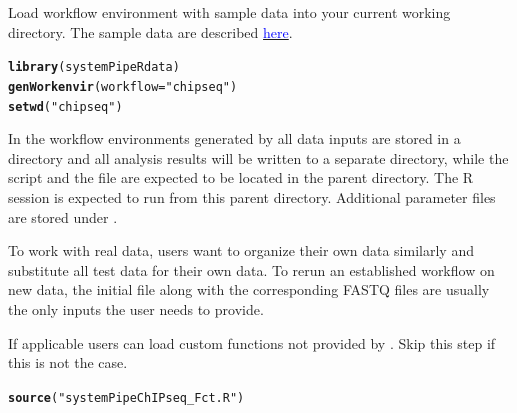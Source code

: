 \documentclass{article}\usepackage[]{graphicx}\usepackage[]{color}
\makeatletter
\newcommand{\hlstr}[1]{\textcolor[rgb]{0.192,0.494,0.8}{#1}}%
\newcommand{\hlstd}[1]{\textcolor[rgb]{0.345,0.345,0.345}{#1}}%
\newcommand{\hlkwc}[1]{\textcolor[rgb]{0.333,0.667,0.333}{#1}}%
\newcommand{\hlkwd}[1]{\textcolor[rgb]{0.737,0.353,0.396}{\textbf{#1}}}%
\newenvironment{kframe}{%
 \def\at@end@of@kframe{}%
 \ifinner\ifhmode%
  \def\at@end@of@kframe{\end{minipage}}%
  \begin{minipage}{\columnwidth}%
 \fi\fi%
 \def\FrameCommand##1{\hskip\@totalleftmargin \hskip-\fboxsep
 \colorbox{shadecolor}{##1}\hskip-\fboxsep
     \hskip-\linewidth \hskip-\@totalleftmargin \hskip\columnwidth}%
 \MakeFramed {\advance\hsize-\width
   \@totalleftmargin\z@ \linewidth\hsize
   \@setminipage}}%
 {\par\unskip\endMakeFramed%
 \at@end@of@kframe}
\newenvironment{knitrout}{}{} %
\makeatother
\begin{document}
Load workflow environment with sample data into your current working directory. The sample data are described  \href{http://www.bioconductor.org/packages/devel/bioc/vignettes/systemPipeR/inst/doc/systemPipeR.html#load-sample-data-and-workflow-templates}{\textcolor{blue}{here}}.
\begin{knitrout}
\color{fgcolor}\begin{kframe}
\begin{alltt}
\hlkwd{library}\hlstd{(systemPipeRdata)}
\hlkwd{genWorkenvir}\hlstd{(}\hlkwc{workflow}\hlstd{=}\hlstr{"chipseq"}\hlstd{)}
\hlkwd{setwd}\hlstd{(}\hlstr{"chipseq"}\hlstd{)}
\end{alltt}
\end{kframe}
\end{knitrout}

In the workflow environments generated by  all data inputs are stored in a  directory and all analysis results will be written to a separate  directory, while the  script and the  file are expected to be located in the parent directory. The R session is expected to run from this parent directory. Additional parameter files are stored under .

To work with real data, users want to organize their own data similarly and substitute all test data for their own data. To rerun an established workflow on new data, the initial  file along with the corresponding FASTQ files are usually the only inputs the user needs to provide.

If applicable users can load custom functions not provided by . Skip this step if this is not the case.
\begin{knitrout}
\color{fgcolor}\begin{kframe}
\begin{alltt}
\hlkwd{source}\hlstd{(}\hlstr{"systemPipeChIPseq_Fct.R"}\hlstd{)}
\end{alltt}
\end{kframe}
\end{knitrout}
\end{document}
